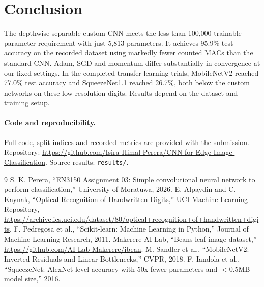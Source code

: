 \documentclass[11pt,a4paper]{article}
\begin{document}
\section{Conclusion}
The depthwise-separable custom CNN meets the less-than-100,000 trainable parameter requirement with just 5,813 parameters. It achieves 95.9\% test accuracy on the recorded dataset using markedly fewer counted MACs than the standard CNN. Adam, SGD and momentum differ substantially in convergence at our fixed settings. In the completed transfer-learning trials, MobileNetV2 reached 77.0\% test accuracy and SqueezeNet1.1 reached 26.7\%, both below the custom networks on these low-resolution digits. Results depend on the dataset and training setup.

\paragraph{Code and reproducibility.} Full code, split indices and recorded metrics are provided with the submission. Repository: \url{https://github.com/Isira-Himal-Perera/CNN-for-Edge-Image-Classification}. Source results: \texttt{results/}.

\begin{thebibliography}{9}\small
{} S. K. Perera, ``EN3150 Assignment 03: Simple convolutional neural network to perform classification,'' University of Moratuwa, 2026.
 E. Alpaydin and C. Kaynak, ``Optical Recognition of Handwritten Digits,'' UCI Machine Learning Repository, \url{https://archive.ics.uci.edu/dataset/80/optical+recognition+of+handwritten+digits}.
 F. Pedregosa et al., ``Scikit-learn: Machine Learning in Python,'' Journal of Machine Learning Research, 2011.
 Makerere AI Lab, ``Beans leaf image dataset,'' \url{https://github.com/AI-Lab-Makerere/ibean}.
 M. Sandler et al., ``MobileNetV2: Inverted Residuals and Linear Bottlenecks,'' CVPR, 2018.
 F. Iandola et al., ``SqueezeNet: AlexNet-level accuracy with 50x fewer parameters and $<$0.5MB model size,'' 2016.
\end{thebibliography}
\end{document}

